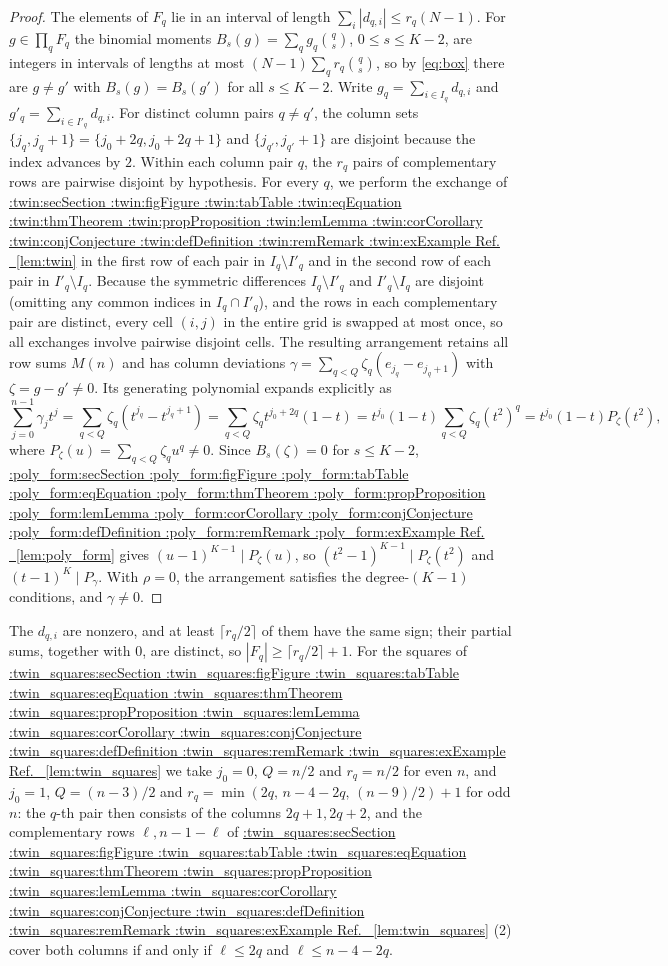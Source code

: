 \documentclass[11pt,a4paper]{article}
\makeatletter
\def\Cref@getprefix#1:#2\relax{#1}
\def\Cref@prefix@sec{sec}
\def\Cref@prefix@fig{fig}
\def\Cref@prefix@tab{tab}
\def\Cref@prefix@eq{eq}
\def\Cref@prefix@thm{thm}
\def\Cref@prefix@prop{prop}
\def\Cref@prefix@lem{lem}
\def\Cref@prefix@cor{cor}
\def\Cref@prefix@conj{conj}
\def\Cref@prefix@def{def}
\def\Cref@prefix@rem{rem}
\def\Cref@prefix@ex{ex}
\def\Cref@type@cap#1{%
  \edef\Cref@tmp{#1}%
  \ifx\Cref@tmp\Cref@prefix@sec Section%
  \else\ifx\Cref@tmp\Cref@prefix@fig Figure%
  \else\ifx\Cref@tmp\Cref@prefix@tab Table%
  \else\ifx\Cref@tmp\Cref@prefix@eq Equation%
  \else\ifx\Cref@tmp\Cref@prefix@thm Theorem%
  \else\ifx\Cref@tmp\Cref@prefix@prop Proposition%
  \else\ifx\Cref@tmp\Cref@prefix@lem Lemma%
  \else\ifx\Cref@tmp\Cref@prefix@cor Corollary%
  \else\ifx\Cref@tmp\Cref@prefix@conj Conjecture%
  \else\ifx\Cref@tmp\Cref@prefix@def Definition%
  \else\ifx\Cref@tmp\Cref@prefix@rem Remark%
  \else\ifx\Cref@tmp\Cref@prefix@ex Example%
  \else Ref.%
  \fi\fi\fi\fi\fi\fi\fi\fi\fi\fi\fi\fi
}
\DeclareRobustCommand{\Cref}[1]{%
  \begingroup
  \edef\Cref@label{#1}%
  \edef\Cref@prefix{\expandafter\Cref@getprefix\Cref@label:\relax}%
  \hyperref[#1]{\Cref@type@cap{\Cref@prefix}~\ref*{#1}}%
  \endgroup
}
\theoremstyle{plain}
\theoremstyle{definition}
\theoremstyle{remark}
\makeatother
\begin{document}
\begin{proof}
The elements of $F_q$ lie in an interval of length $\sum_i|d_{q,i}|\le r_q(N-1)$.
For $g\in\prod_qF_q$ the binomial moments $B_s(g)=\sum_qg_q\binom qs$, $0\le s\le K-2$, are integers in intervals of lengths at most $(N-1)\sum_qr_q\binom qs$, so by \eqref{eq:box} there are $g\ne g'$ with $B_s(g)=B_s(g')$ for all $s\le K-2$.
Write $g_q=\sum_{i\in I_q}d_{q,i}$ and $g'_q=\sum_{i\in I'_q}d_{q,i}$.
For distinct column pairs $q\ne q'$, the column sets $\{j_q, j_q+1\}=\{j_0+2q, j_0+2q+1\}$ and $\{j_{q'}, j_{q'}+1\}$ are disjoint because the index advances by $2$.
Within each column pair $q$, the $r_q$ pairs of complementary rows are pairwise disjoint by hypothesis.
For every $q$, we perform the exchange of \Cref{lem:twin} in the first row of each pair in $I_q\setminus I'_q$ and in the second row of each pair in $I'_q\setminus I_q$.
Because the symmetric differences $I_q\setminus I'_q$ and $I'_q\setminus I_q$ are disjoint (omitting any common indices in $I_q\cap I'_q$), and the rows in each complementary pair are distinct, every cell $(i,j)$ in the entire grid is swapped at most once, so all exchanges involve pairwise disjoint cells.
The resulting arrangement retains all row sums $M(n)$ and has column deviations $\gamma=\sum_{q<Q}\zeta_q(e_{j_q}-e_{j_q+1})$ with $\zeta=g-g'\ne0$.
Its generating polynomial expands explicitly as
\begin{equation}
\sum_{j=0}^{n-1}\gamma_jt^j=\sum_{q<Q}\zeta_q(t^{j_q}-t^{j_q+1})=\sum_{q<Q}\zeta_qt^{j_0+2q}(1-t)=t^{j_0}(1-t)\sum_{q<Q}\zeta_q(t^2)^q=t^{j_0}(1-t)P_\zeta(t^2),
\label{eq:box_poly_step}
\end{equation}
where $P_\zeta(u)=\sum_{q<Q}\zeta_qu^q\ne0$.
Since $B_s(\zeta)=0$ for $s\le K-2$, \Cref{lem:poly_form} gives $(u-1)^{K-1}\mid P_\zeta(u)$, so $(t^2-1)^{K-1}\mid P_\zeta(t^2)$ and $(t-1)^{K}\mid P_\gamma$.
With $\rho=0$, the arrangement satisfies the degree-$(K-1)$ conditions, and $\gamma\ne0$.
\end{proof}

The $d_{q,i}$ are nonzero, and at least $\lceil r_q/2\rceil$ of them have the same sign; their partial sums, together with $0$, are distinct, so $|F_q|\ge\lceil r_q/2\rceil+1$.
For the squares of \Cref{lem:twin_squares} we take $j_0=0$, $Q=n/2$ and $r_q=n/2$ for even $n$, and $j_0=1$, $Q=(n-3)/2$ and $r_q=\min(2q,\,n-4-2q,\,(n-9)/2)+1$ for odd $n$: the $q$-th pair then consists of the columns $2q+1,2q+2$, and the complementary rows $\ell,n-1-\ell$ of \Cref{lem:twin_squares}(2) cover both columns if and only if $\ell\le2q$ and $\ell\le n-4-2q$.
\end{document}
